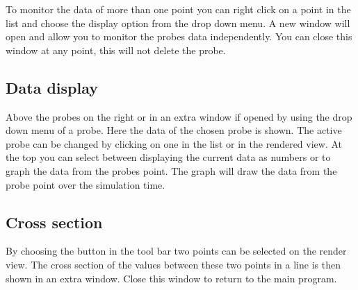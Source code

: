 \documentclass[paper=a4]{proc}
\begin{document}
		To monitor the data of more than one point you can right click on a point in the list and choose the display option from the drop down menu. A new window will open and allow you to monitor the probes data independently. You can close this window at any point, this will not delete the probe.
		\subsection{Data display}
		Above the probes on the right or in an extra window if opened by using the drop down menu of a probe. Here the data of the chosen probe is shown. The active probe can be changed by clicking on one in the list or in the rendered view. At the top you can select between displaying the current data as numbers or to graph the data from the probes point. The graph will draw the data from the probe point over the simulation time.
		\subsection{Cross section}
		By choosing the button in the tool bar two points can be selected on the render view. The cross section of the values between these two points in a line is then shown in an extra window. Close this window to return to the main program.
\end{document}

